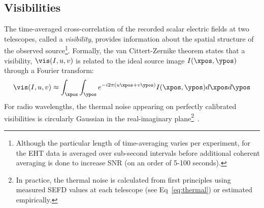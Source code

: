 \vspace{-.2in}
\subsection{Visibilities }
\label{sec:vis}


The time-averaged cross-correlation of the recorded scalar electric fields at two telescopes, called a {\it visibility}, provides information about the spatial structure of the observed source\footnote{Although the particular length of time-averaging varies per experiment, for the EHT data is averaged over sub-second intervals before additional coherent averaging is done to increase SNR (on an order of 5-100 seconds).}. Formally, the van Cittert-Zernike theorem states that a visibility, $\vis(I, u,v)$ is related to the ideal source image $I(\xpos, \ypos)$ through a Fourier transform: 
\begin{align}
\vis(I, u,v) \approx \int_{\xpos} \int_{\ypos} e^{-i2 \pi (u\xpos + v \ypos) } I(\xpos, \ypos) d\xpos d\ypos
\label{eq:vcz}
\end{align}
For radio wavelengths, the thermal noise appearing on perfectly calibrated visibilities is 
circularly Gaussian in the real-imaginary plane\footnote{In practice, the thermal noise is calculated from first principles using measured SEFD values at each telescope (see Eq~\ref{eq:thermal}) or estimated empirically. }~\cite{taylor1999synthesis}.





